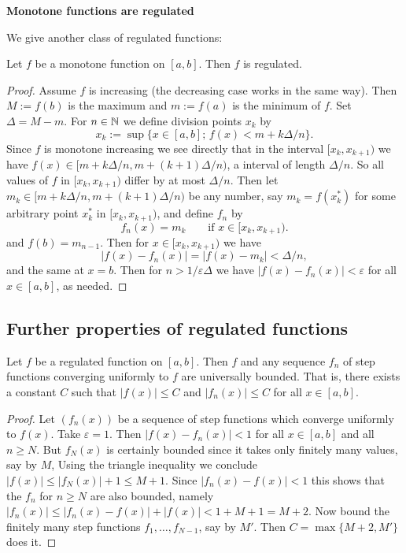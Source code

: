\documentclass[10pt, a4paper]{article}
\begin{document}
\textbf{Monotone functions are regulated}

We give another class of regulated functions:
\begin{proposition}\label{pre:analy:prop:iffmonotonethenfreg}
    Let $f$ be a monotone function on $[a, b]$.
    Then $f$ is regulated.
    \begin{proof}
        Assume $f$ is increasing
        (the decreasing case works in the same way).
        Then $M := f(b)$ is the maximum and $m := f(a)$ is the minimum of $f$.
        Set $\Delta = M - m$.
        For $n \in \mathbb{N}$ we define division points $x_k$ by
        \[
        x_k := \sup\{x \in [a, b];\, f(x) < m + k\Delta / n\}.
        \]
        Since $f$ is monotone increasing we see directly that in the interval $[x_k, x_{k + 1})$ we have $f(x) \in [m + k\Delta / n, m + (k + 1)\Delta / n)$,
        a interval of length $\Delta / n$.
        So all values of $f$ in $[x_k, x_{k + 1})$ differ by at most $\Delta / n$.
        Then let $m_k \in [m + k\Delta / n, m + (k + 1)\Delta / n)$ be any number,
        say $m_k = f(x_{k} ^ {*})$ for some arbitrary point $x_{k} ^ {*}$ in $[x_k, x_{k + 1})$,
        and define $f_n$ by
        \[
        f_n(x) = m_k\qquad\text{if } x \in [x_k, x_{k + 1}).
        \]
        and $f(b) = m_{n - 1}$.
        Then for $x \in [x_k, x_{k + 1})$ we have
        \[
        |f(x) - f_n(x)| = |f(x) - m_k| < \Delta / n,
        \]
        and the same at $x = b$.
        Then for $n > 1 / \varepsilon\Delta$ we have $|f(x) - f_n(x)| < \varepsilon$ for all $x \in [a, b]$,
        as needed.
    \end{proof}
\end{proposition}

\subsection{Further properties of regulated functions}

\begin{lemma}\label{pre:analy:lem:regfuncisuniversallybounded}
    Let $f$ be a regulated function on $[a, b]$.
    Then $f$ and any sequence $f_n$ of step functions converging uniformly to $f$ are universally bounded.
    That is,
    there exists a constant $C$ such that $|f(x)| \leq C$ and $|f_n(x)| \leq C$ for all $x \in [a, b]$.
    \begin{proof}
        Let $(f_n(x))$ be a sequence of step functions which converge uniformly to $f(x)$.
        Take $\varepsilon = 1$.
        Then $|f(x) - f_n(x)| < 1$ for all $x \in [a, b]$ and all $n \geq N$.
        But $f_N(x)$ is certainly bounded since it takes only finitely many values,
        say by $M$,
        Using the triangle inequality we conclude $|f(x)| \leq |f_N(x)| + 1 \leq M + 1$.
        Since $|f_n(x) - f(x)| < 1$ this shows that the $f_n$ for $n \geq N$ are also bounded,
        namely $|f_n(x)| \leq |f_n(x) - f(x)| + |f(x)| < 1 + M + 1 = M + 2$.
        Now bound the finitely many step functions $f_1, \dotsc, f_{N - 1}$,
        say by $M'$.
        Then $C = \max\{M + 2, M'\}$ does it.
    \end{proof}
\end{lemma}
\end{document}
